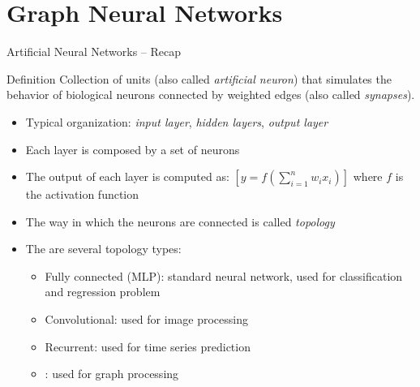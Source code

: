 \documentclass[presentation, 9pt]{beamer}\mode<presentation>{\usetheme{AMSBolognaFC}}
\begin{document}
\section{Graph Neural Networks}
\begin{frame}{Artificial Neural Networks -- Recap}
\begin{alertblock}{Definition}
	Collection of units (also called \emph{artificial neuron}) that simulates the behavior of biological neurons
	connected by weighted edges (also called \emph{synapses}).
\end{alertblock}
\begin{itemize}
	\item Typical organization: \emph{input layer}, \emph{hidden layers}, \emph{output layer}
	\item Each layer is composed by a set of neurons
	\item The output of each layer is computed as: $[y = f(\sum_{i=1}^n w_i x_i)]$ where $f$ is the activation function
	\item The way in which the neurons are connected is called \emph{topology}
	\item The are several topology types:
	\begin{itemize}
		\item Fully connected (MLP): standard neural network, used for classification and regression problem 
		\item Convolutional: used for image processing
		\item Recurrent: used for time series prediction
		\item {}: used for graph processing
	\end{itemize}
\end{itemize}
\end{frame}
\end{document}
